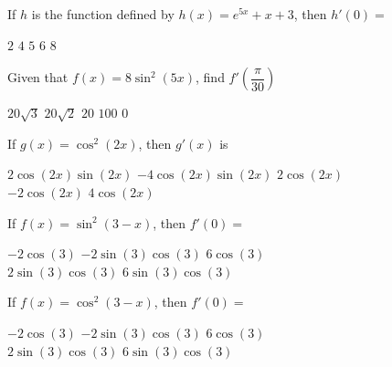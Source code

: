 \begin{questions}
    \question If $h$ is the function defined by $h(x) = e^{5x} + x + 3$, then $h'(0) = $ \\
    
    \begin{oneparchoices}
        \choice $2$
        \choice $4$
        \choice $5$
        \choice $6$
        \choice $8$
    \end{oneparchoices} \par \horizontalline

    \question Given that $f(x) = 8\sin^2 (5x)$, find $f'\left(\dfrac{\pi}{30}\right)$ \\

    \begin{oneparchoices}
        \choice $20\sqrt{3}$
        \choice $20\sqrt{2}$
        \choice $20$
        \choice $100$
        \choice $0$
    \end{oneparchoices} \par \horizontalline

    \question If $g(x) = \cos^2 (2x)$, then $g'(x)$ is \\

    \begin{oneparchoices}
        \choice $2\cos (2x)\sin (2x)$
        \choice $-4\cos (2x)\sin (2x)$
        \choice $2\cos (2x)$ \\[11pt]
        \makebox[0.25 \textwidth] \choice $-2\cos (2x)$ 
        \makebox[0.25 \textwidth] \choice $4\cos (2x)$
    \end{oneparchoices} \par \horizontalline

    \question If $f(x) = \sin^2(3 - x)$, then $f'(0) = $ \\

    \begin{oneparchoices}
        \choice $-2\cos (3)$
        \choice $-2\sin (3)\cos (3)$
        \choice $6\cos (3)$ \\[11pt]
        \makebox[0.25 \textwidth] \choice $2\sin (3)\cos (3)$ 
        \makebox[0.23 \textwidth] \choice $6\sin (3)\cos (3)$  
    \end{oneparchoices} \par \horizontalline 

    \question If $f(x) = \cos^2(3 - x)$, then $f'(0) = $ \\

    \begin{oneparchoices}
        \choice $-2\cos (3)$
        \choice $-2\sin (3)\cos (3)$
        \choice $6\cos (3)$ \\[11pt]
        \makebox[0.25 \textwidth] \choice $2\sin (3)\cos (3)$ 
        \makebox[0.23 \textwidth] \choice $6\sin (3)\cos (3)$  
    \end{oneparchoices} \par \horizontalline 


\end{questions}
